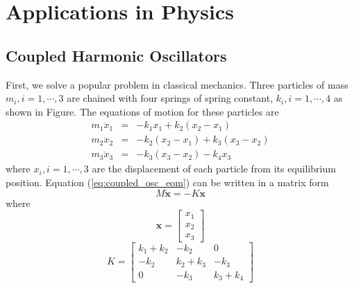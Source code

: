 {\noindent
\section{Applications in Physics}

\subsection{Coupled Harmonic Oscillators}

First, we solve a popular problem in classical mechanics\cite{coupled_osc}.
Three particles of mass $m_i, i=1, \cdots, 3$ are chained with four springs of spring constant, $k_i, i=1,\cdots, 4$ as shown in Figure.  The equations of motion for these particles are
\begin{subequations}
\begin{eqnarray}
m_1 \ddot{x}_1 &=& -k_1 x_1 + k_2 (x_2-x_1) \\
m_2 \ddot{x}_2 &=& -k_2 (x_2-x_1) + k_3 (x_3-x_2)\\
m_3 \ddot{x}_3 &=& -k_3 (x_3-x_2) - k_4 x_3
\end{eqnarray}
\label{eq:coupled_osc_eom}
\end{subequations}
where $x_i, i=1, \cdots, 3$ are the displacement of each particle from its equilibrium position. Equation (\ref{eq:coupled_osc_eom}) can be written in a matrix form
\begin{equation}
M \ddot{\mathbf{x}} = - K \mathbf{x}
\end{equation}
where
\begin{equation}
\mathbf{x}=\begin{bmatrix} x_1 \\ x_2 \\ x_3 \end{bmatrix}
\end{equation}
\begin{equation}
K = \begin{bmatrix} k_1+k_2 & -k_2 & 0 \\-k_2 & k_2 + k_3 & - k_3\\ 0 & -k_3 & k_3+k_4 \end{bmatrix}
\end{equation}

}
